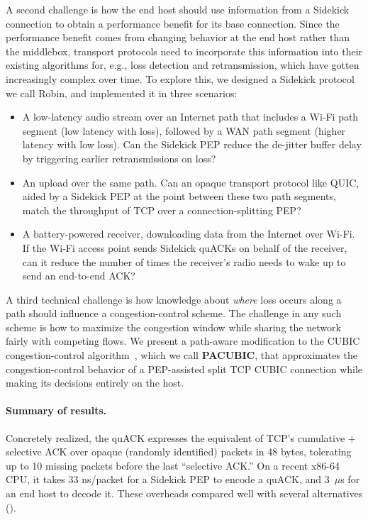 A second challenge is how the end host should use information from a Sidekick
connection to obtain a performance benefit for its base connection. Since the
performance benefit comes from changing behavior at the end host rather than
the middlebox, transport protocols need to incorporate this information into
their existing algorithms for, e.g., loss detection and retransmission, which
have gotten increasingly complex over time. To explore this, we designed a
Sidekick protocol we call Robin, and implemented it in three scenarios:
\begin{itemize}[noitemsep,topsep=2pt]
\item A low-latency audio stream over an Internet path that includes a Wi-Fi path segment
  (low latency with loss), followed by a WAN path segment (higher latency
  with low loss). Can the Sidekick PEP reduce the de-jitter buffer delay
  by triggering earlier retransmissions on loss?

\item An upload over the same path. Can an opaque transport protocol like QUIC,
  aided by a Sidekick PEP at the point between these two path segments, match
  the throughput of TCP over a connection-splitting PEP?

\item A battery-powered receiver, downloading data from the Internet over Wi-Fi.
  If the Wi-Fi access point sends Sidekick quACKs on behalf of the receiver,
  can it reduce the number of times the receiver's radio needs to wake up
  to send an end-to-end ACK?
\end{itemize}

\smallskip

A third technical challenge is how knowledge about \emph{where}
loss occurs along a path should influence a congestion-control scheme.
The challenge in any such scheme is how to maximize the congestion window
while sharing the network fairly with competing flows.
We present a path-aware modification to the CUBIC congestion-control
algorithm~\cite{ha2008cubic}, which we call \mbox{\textbf{PACUBIC}},
that approximates the congestion-control behavior of a PEP-assisted split TCP
CUBIC connection while making its decisions entirely on the host.

\paragraph{Summary of results.}

Concretely realized, the quACK expresses the equivalent of TCP's
cumulative + selective ACK over opaque (randomly identified) packets
in 48 bytes, tolerating up to 10 missing packets before the last
``selective ACK.'' On a recent x86-64 CPU, it takes 33 ns/packet for a Sidekick PEP
to encode a quACK, and 3~$\mu$s for an end host to decode it. These
overheads compared
well with several alternatives
().

